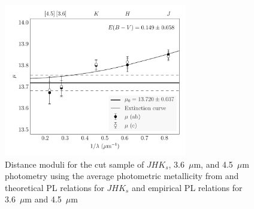 \documentclass[a4paper,fleqn,usenatbib]{mnras}
\begin{document}
\begin{figure}
\begin{center}
\includegraphics[width=80mm]{final_plots/multiwavelength_distance_phot_abc.pdf}
\caption{Distance moduli for the cut sample of $J\!H\!K_s$, 3.6~$\mu$m, and 4.5~$\mu$m photometry using the average photometric metallicity from \citet{2006ApJ...640L..43S} and theoretical PL relations for $J\!H\!K_s$ and empirical PL relations for 3.6~$\mu$m and 4.5~$\mu$m}
\label{fig:omegaCen_dist_m4}
\end{center}
\end{figure}

\end{document}
